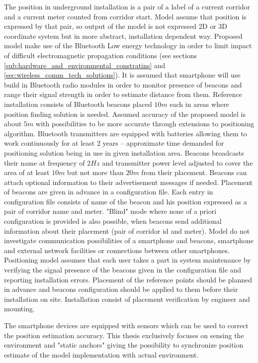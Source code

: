 \documentclass[../main.tex]{subfiles}
\begin{document}
The position in underground installation is a pair of a label of a current corridor and a current meter counted from corridor start. Model assume that position is expressed by that pair, so output of the model is not expressed 2D or 3D coordinate system but in more abstract, installation dependent way. Proposed model make use of the Bluetooth Low energy technology in order to limit impact of difficult electromagnetic propagation conditions (see sections \ref{sub:hardware_and_environmental_constratins} and \ref{sec:wireless_comm_tech_solutions}). It is assumed that smartphone will use build in Bluetooth radio modules in order to monitor presence of beacons and range their signal strength in order to estimate distance from them. Reference installation consists of Bluetooth beacons placed $10m$ each in areas where position finding solution is needed. Assumed accuracy of the proposed model is about $5m$ with possibilities to be more accurate through extensions to positioning algorithm. Bluetooth transmitters are equipped with batteries allowing them to work continuously for at least 2 years -- approximate time demanded for positioning solution being in use in given installation area. Beacons broadcasts their name at frequency of $2Hz$ and transmitter power level adjusted to cover the area of at least $10m$ but not more than $20m$ from their placement. Beacons can attach optional information to their advertisement messages if needed. Placement of beacons are given in advance in a configuration file. Each entry in configuration file consists of name of the beacon and his position expressed as a pair of corridor name and meter. "Blind" mode where none of a priori configuration is provided is also possible, when beacons send additional information about their placement (pair of corridor id and meter). Model do not investigate communication possibilities of a smartphone and beacons, smartphone and external network facilities or connections between other smartphones. Positioning model assumes that each user takes a part in system maintenance by verifying the signal presence of the beacons given in the configuration file and reporting installation errors. Placement of the reference points should be planned in advance and beacons configuration should be applied to them before their installation on site. Installation consist of placement verification by engineer and mounting.

The smartphone devices are equipped with sensors which can be used to correct the position estimation accuracy. This thesis exclusively focuses on sensing the environment and "static anchors" giving the possibility to synchronize position estimate of the model implementation with actual environment.
\end{document}
